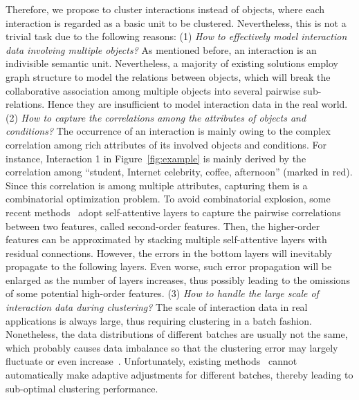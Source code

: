 \documentclass[11pt]{article}
\begin{document}
Therefore, we propose to cluster interactions instead of objects, where each interaction is regarded as a basic unit to be clustered. Nevertheless, this is not a trivial task due to the following reasons:
(1) \textit{How to effectively model interaction data involving multiple objects? }
As mentioned before, an interaction is an indivisible semantic unit. Nevertheless, a majority of existing solutions employ graph structure to model the relations between objects, which will break the collaborative association among multiple objects into several pairwise sub-relations. Hence they are insufficient to model interaction data in the real world.
(2) \textit{How to capture the correlations among the attributes of objects and conditions? }
The occurrence of an interaction is mainly owing to the complex correlation among rich attributes of its involved objects and conditions. For instance, Interaction 1 in Figure~\ref{fig:example} is mainly derived by the correlation among ``student, Internet celebrity, coffee, afternoon'' (marked in red). Since this correlation is among multiple attributes,  capturing them is a combinatorial optimization problem. To avoid combinatorial explosion, some recent methods~\cite{song_autoint_2019,xu_disentangled_2021} adopt self-attentive layers to capture the pairwise correlations between two features, called second-order features. Then, the higher-order features can be approximated by stacking multiple self-attentive layers with residual connections.
However, the errors in the bottom layers will inevitably propagate to the following layers. Even worse, such error propagation will be enlarged as the number of layers increases, thus possibly leading to the omissions of some potential high-order features.
(3) \textit{How to handle the large scale of interaction data during clustering? }
The scale of interaction data in real applications is always large, thus requiring clustering in a batch fashion. Nonetheless, the data distributions of different batches are usually not the same, which probably causes data imbalance so that the clustering error may largely fluctuate or even increase~\cite{yan_deep_2015}.
Unfortunately, existing methods~\cite{xie_unsupervised_2016,wang_attributed_2019} cannot automatically make adaptive adjustments for different batches, thereby leading to sub-optimal clustering performance.
\end{document}
